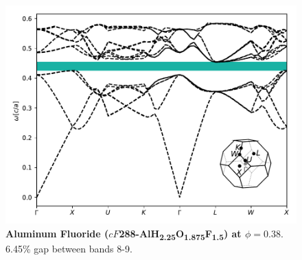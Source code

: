 \documentclass[fleqn,amsmath,amssymb,superscriptaddress, reprint,prl]{revtex4-1}
\begin{document}
\begin{figure}
\includegraphics[width=0.9\linewidth]{workspace/38198cf16cc5ca53f90667fddd901139/images/r=11.pdf}
	\caption{\textbf{Aluminum Fluoride ($cF$288-AlH\textsubscript{2}\textsubscript{.}\textsubscript{2}\textsubscript{5}O\textsubscript{1}\textsubscript{.}\textsubscript{8}\textsubscript{7}\textsubscript{5}F\textsubscript{1}\textsubscript{.}\textsubscript{5}) at $\phi=0.38$}. 6.45\% gap between bands 8-9.}
\end{figure}
\end{document}
